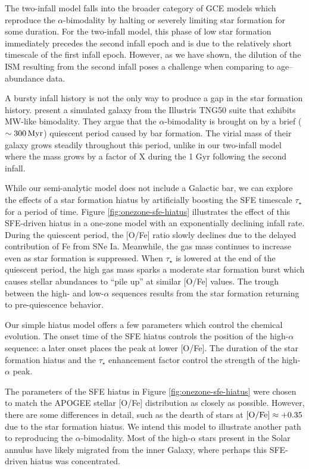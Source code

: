 \documentclass[twocolumn,twocolappendix,linenumbers]{aastex631}
\newcommand{\todo}[1]{{\color{red}#1}}
\newcommand{\mathOFe}{{\rm [O/Fe]}}
\begin{document}
The two-infall model falls into the broader category of GCE models which reproduce the $\alpha$-bimodality by halting or severely limiting star formation for some duration. For the two-infall model, this phase of low star formation immediately precedes the second infall epoch and is due to the relatively short timescale of the first infall epoch. However, as we have shown, the dilution of the ISM resulting from the second infall poses a challenge when comparing to age--abundance data.

A bursty infall history is not the only way to produce a gap in the star formation history. \citet{beane_rising_2024} present a simulated galaxy from the Illustris TNG50 suite that exhibits MW-like bimodality. They argue that the $\alpha$-bimodality is brought on by a brief ($\sim300\,{\rm Myr}$) quiescent period caused by bar formation. The virial mass of their galaxy grows steadily throughout this period, unlike in our two-infall model where the mass grows by a factor of \todo{X} during the 1 Gyr following the second infall.

While our semi-analytic model does not include a Galactic bar, we can explore the effects of a star formation hiatus by artificially boosting the SFE timescale $\tau_\star$ for a period of time. Figure \ref{fig:onezone-sfe-hiatus} illustrates the effect of this SFE-driven hiatus in a one-zone model with an exponentially declining infall rate. During the quiescent period, the [O/Fe] ratio slowly declines due to the delayed contribution of Fe from SNe Ia. Meanwhile, the gas mass continues to increase even as star formation is suppressed. When $\tau_\star$ is lowered at the end of the quiescent period, the high gas mass sparks a moderate star formation burst which causes stellar abundances to ``pile up'' at similar [O/Fe] values. The trough between the high- and low-$\alpha$ sequences results from the star formation returning to pre-quiescence behavior.

Our simple hiatus model offers a few parameters which control the chemical evolution. The onset time of the SFE hiatus controls the position of the high-$\alpha$ sequence: a later onset places the peak at lower [O/Fe]. The duration of the star formation hiatus and the $\tau_\star$ enhancement factor control the strength of the high-$\alpha$ peak.

The parameters of the SFE hiatus in Figure \ref{fig:onezone-sfe-hiatus} were chosen to match the APOGEE stellar [O/Fe] distribution as closely as possible. However, there are some differences in detail, such as the dearth of stars at $\mathOFe\approx+0.35$ due to the star formation hiatus. We intend this model to illustrate another path to reproducing the $\alpha$-bimodality. Most of the high-$\alpha$ stars present in the Solar annulus have likely migrated from the inner Galaxy, where perhaps this SFE-driven hiatus was concentrated.
\end{document}
